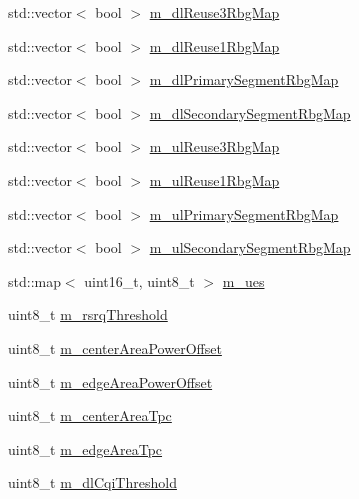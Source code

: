 \begin{DoxyCompactItemize}
std\+::vector$<$ bool $>$ \hyperlink{classns3_1_1LteFfrEnhancedAlgorithm_a9863d7e2ad037b71c46305090394744c}{m\+\_\+dl\+Reuse3\+Rbg\+Map}
\item 
std\+::vector$<$ bool $>$ \hyperlink{classns3_1_1LteFfrEnhancedAlgorithm_adb513809f3ba8af01388fddc79ee7a3b}{m\+\_\+dl\+Reuse1\+Rbg\+Map}
\item 
std\+::vector$<$ bool $>$ \hyperlink{classns3_1_1LteFfrEnhancedAlgorithm_a786fc72c16a48131ac40ee45f7213966}{m\+\_\+dl\+Primary\+Segment\+Rbg\+Map}
\item 
std\+::vector$<$ bool $>$ \hyperlink{classns3_1_1LteFfrEnhancedAlgorithm_a600e9d11aa25cdbf62e055fbcce44e8b}{m\+\_\+dl\+Secondary\+Segment\+Rbg\+Map}
\item 
std\+::vector$<$ bool $>$ \hyperlink{classns3_1_1LteFfrEnhancedAlgorithm_aacf7410e420a084b0247e5b960ba06d4}{m\+\_\+ul\+Reuse3\+Rbg\+Map}
\item 
std\+::vector$<$ bool $>$ \hyperlink{classns3_1_1LteFfrEnhancedAlgorithm_a6a1950d59372ae78b353cd2836df4496}{m\+\_\+ul\+Reuse1\+Rbg\+Map}
\item 
std\+::vector$<$ bool $>$ \hyperlink{classns3_1_1LteFfrEnhancedAlgorithm_a8ba9cf053d97e3cb16207abbe8596525}{m\+\_\+ul\+Primary\+Segment\+Rbg\+Map}
\item 
std\+::vector$<$ bool $>$ \hyperlink{classns3_1_1LteFfrEnhancedAlgorithm_aedd739afe07f7716e660f175b05c31f7}{m\+\_\+ul\+Secondary\+Segment\+Rbg\+Map}
\item 
std\+::map$<$ uint16\+\_\+t, uint8\+\_\+t $>$ \hyperlink{classns3_1_1LteFfrEnhancedAlgorithm_adac3233d5e9a87d83e6179f02f4f6d46}{m\+\_\+ues}
\item 
uint8\+\_\+t \hyperlink{classns3_1_1LteFfrEnhancedAlgorithm_abc46da1b7fd36b05250bd7b6e10c814e}{m\+\_\+rsrq\+Threshold}
\item 
uint8\+\_\+t \hyperlink{classns3_1_1LteFfrEnhancedAlgorithm_a645576354030ccca6a9f7942110f73e9}{m\+\_\+center\+Area\+Power\+Offset}
\item 
uint8\+\_\+t \hyperlink{classns3_1_1LteFfrEnhancedAlgorithm_af0271925d69d405352df0ee7255bee71}{m\+\_\+edge\+Area\+Power\+Offset}
\item 
uint8\+\_\+t \hyperlink{classns3_1_1LteFfrEnhancedAlgorithm_a691a9031ef47da59d0bfbf4237b47cd6}{m\+\_\+center\+Area\+Tpc}
\item 
uint8\+\_\+t \hyperlink{classns3_1_1LteFfrEnhancedAlgorithm_a7aeabe8a846be02adc93f8e08d5fd6b2}{m\+\_\+edge\+Area\+Tpc}
\item 
uint8\+\_\+t \hyperlink{classns3_1_1LteFfrEnhancedAlgorithm_a689079599521cf458db492f362d3c2bb}{m\+\_\+dl\+Cqi\+Threshold}

\end{DoxyCompactItemize}
